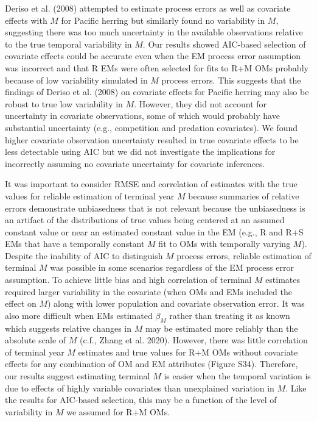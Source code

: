 \documentclass[
  12pt,
]{article}
\begin{document}
Deriso et al. (2008) attempted to estimate process errors as well as
covariate effects with \(M\) for Pacific herring but similarly found no
variability in \(M\), suggesting there was too much uncertainty in the
available observations relative to the true temporal variability in
\(M\). Our results showed AIC-based selection of covariate effects could
be accurate even when the EM process error assumption was incorrect and
that R EMs were often selected for fits to R+M OMs probably because of
low variability simulated in \(M\) process errors. This suggests that
the findings of Deriso et al. (2008) on covariate effects for Pacific
herring may also be robust to true low variability in \(M\). However,
they did not account for uncertainty in covariate observations, some of
which would probably have substantial uncertainty (e.g., competition and
predation covariates). We found higher covariate observation uncertainty
resulted in true covariate effects to be less detectable using AIC but
we did not investigate the implications for incorrectly assuming no
covariate uncertainty for covariate inferences.

It was important to consider RMSE and correlation of estimates with the
true values for reliable estimation of terminal year \(M\) because
summaries of relative errors demonstrate unbiasedness that is not
relevant because the unbiasedness is an artifact of the distributions of
true values being centered at an assumed constant value or near an
estimated constant value in the EM (e.g., R and R+S EMs that have a
temporally constant \(M\) fit to OMs with temporally varying \(M\)).
Despite the inability of AIC to distinguish \(M\) process errors,
reliable estimation of terminal \(M\) was possible in some scenarios
regardless of the EM process error assumption. To achieve little bias
and high correlation of terminal \(M\) estimates required larger
variability in the covariate (when OMs and EMs included the effect on
\(M\)) along with lower population and covariate observation error. It
was also more difficult when EMs estimated \(\beta_M\) rather than
treating it as known which suggests relative changes in \(M\) may be
estimated more reliably than the absolute scale of \(M\) (c.f., Zhang et
al. 2020). However, there was little correlation of terminal year \(M\)
estimates and true values for R+M OMs without covariate effects for any
combination of OM and EM attributes (Figure S34). Therefore, our results
suggest estimating terminal \(M\) is easier when the temporal variation
is due to effects of highly variable covariates than unexplained
variation in \(M\). Like the results for AIC-based selection, this may
be a function of the level of variability in \(M\) we assumed for R+M
OMs.
\end{document}
